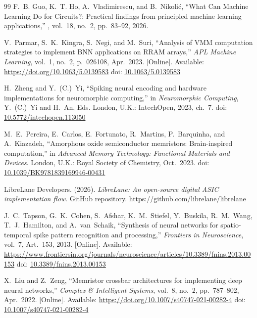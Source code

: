 \documentclass[letter, 12pt]{article}
\begin{document}
\begin{thebibliography}{99}
F.~B. Guo, K.~T. Ho, A.~Vladimirescu, and B.~Nikoli\'{c},
\newblock ``What Can Machine Learning Do for Circuits?: Practical findings from principled machine learning applications,''
, vol.~18, no.~2, pp.~83--92, 2026.

V.~Parmar, S.~K.~Kingra, S.~Negi, and M.~Suri,
``Analysis of VMM computation strategies to implement BNN applications on RRAM arrays,''
\emph{APL Machine Learning}, vol.~1, no.~2, p.~026108, Apr.~2023.
[Online]. Available: \url{https://doi.org/10.1063/5.0139583}
doi: \href{https://doi.org/10.1063/5.0139583}{10.1063/5.0139583}

H.~Zheng and Y.~(C.)~Yi,
``Spiking neural encoding and hardware implementations for neuromorphic computing,''
in \emph{Neuromorphic Computing}, Y.~(C.)~Yi and H.~An, Eds. London, U.K.: IntechOpen, 2023, ch.~7.
doi: \href{https://doi.org/10.5772/intechopen.113050}{10.5772/intechopen.113050}

M.~E.~Pereira, E.~Carlos, E.~Fortunato, R.~Martins, P.~Barquinha, and A.~Kiazadeh,
``Amorphous oxide semiconductor memristors: Brain-inspired computation,''
in \emph{Advanced Memory Technology: Functional Materials and Devices}. 
London, U.K.: Royal Society of Chemistry, Oct.~2023.
doi: \href{https://doi.org/10.1039/BK9781839169946-00431}{10.1039/BK9781839169946-00431}

LibreLane Developers. (2026). \textit{LibreLane: An open-source digital ASIC implementation flow}. GitHub repository. https://github.com/librelane/librelane

J.~C.~Tapson, G.~K.~Cohen, S.~Afshar, K.~M.~Stiefel,
Y.~Buskila, R.~M.~Wang, T.~J.~Hamilton, and A.~van~Schaik,
``Synthesis of neural networks for spatio-temporal spike pattern recognition and processing,''
\emph{Frontiers in Neuroscience}, vol.~7, Art.~153, 2013.
[Online]. Available: \url{https://www.frontiersin.org/journals/neuroscience/articles/10.3389/fnins.2013.00153}
doi: \href{https://doi.org/10.3389/fnins.2013.00153}{10.3389/fnins.2013.00153}

X.~Liu and Z.~Zeng,
``Memristor crossbar architectures for implementing deep neural networks,''
\emph{Complex \& Intelligent Systems}, vol.~8, no.~2, pp.~787--802, Apr.~2022.
[Online]. Available: \url{https://doi.org/10.1007/s40747-021-00282-4}
doi: \href{https://doi.org/10.1007/s40747-021-00282-4}{10.1007/s40747-021-00282-4}


\end{thebibliography}
\end{document}
